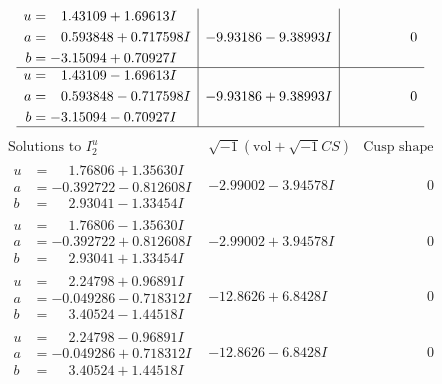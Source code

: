 \documentclass[1p]{elsarticle_modified}
\theoremstyle{definition}
\newcommand{\I}{\sqrt{-1}}
\begin{document}
$$\begin{array}{c|c|c}
\begin{aligned}
u &= \phantom{-}1.43109 + 1.69613 I \\
a &= \phantom{-}0.593848 + 0.717598 I \\
b &= -3.15094 + 0.70927 I\end{aligned}
 & -9.93186 - 9.38993 I & \phantom{-0.000000 } 0 \\ \hline\begin{aligned}
u &= \phantom{-}1.43109 - 1.69613 I \\
a &= \phantom{-}0.593848 - 0.717598 I \\
b &= -3.15094 - 0.70927 I\end{aligned}
 & -9.93186 + 9.38993 I & \phantom{-0.000000 } 0\\
 \hline 
 \end{array}$$\newpage$$\begin{array}{c|c|c}  
\text{Solutions to }I^u_{2}& \I (\text{vol} + \sqrt{-1}CS) & \text{Cusp shape}\\
 \hline 
\begin{aligned}
u &= \phantom{-}1.76806 + 1.35630 I \\
a &= -0.392722 - 0.812608 I \\
b &= \phantom{-}2.93041 - 1.33454 I\end{aligned}
 & -2.99002 - 3.94578 I & \phantom{-0.000000 } 0 \\ \hline\begin{aligned}
u &= \phantom{-}1.76806 - 1.35630 I \\
a &= -0.392722 + 0.812608 I \\
b &= \phantom{-}2.93041 + 1.33454 I\end{aligned}
 & -2.99002 + 3.94578 I & \phantom{-0.000000 } 0 \\ \hline\begin{aligned}
u &= \phantom{-}2.24798 + 0.96891 I \\
a &= -0.049286 - 0.718312 I \\
b &= \phantom{-}3.40524 - 1.44518 I\end{aligned}
 & -12.8626 + 6.8428 I & \phantom{-0.000000 } 0 \\ \hline\begin{aligned}
u &= \phantom{-}2.24798 - 0.96891 I \\
a &= -0.049286 + 0.718312 I \\
b &= \phantom{-}3.40524 + 1.44518 I\end{aligned}
 & -12.8626 - 6.8428 I & \phantom{-0.000000 } 0 \\ \hline\begin{aligned}

\end{aligned}
\end{array}$$
\end{document}

